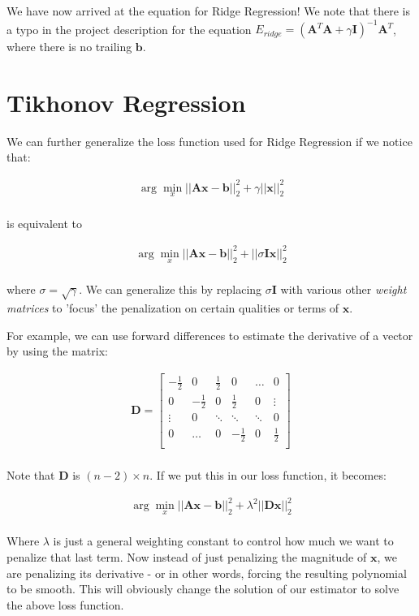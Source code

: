 \documentclass{article}
\newcommand{\x}{\mathbf{x}}
\newcommand{\A}{\mathbf{A}}
\newcommand{\B}{\mathbf{b}} %
\newcommand{\I}{\mathbf{I}}
\newcommand{\D}{\mathbf{D}}
\begin{document}
We have now arrived at the equation for Ridge Regression! We note that there is a typo in the project description for the equation $E_{ridge}=( \A ^T \A + \gamma \I )^{-1} \A ^T$, where there is no trailing $\B$.

\section{Tikhonov Regression}
We can further generalize the loss function used for Ridge Regression if we notice that:


\begin{align*}
\arg \min_{x} ||\A\x-\B||_{2}^{2} + \gamma||\x||_{2}^{2} \\
\end{align*}


is equivalent to 


\begin{align*}
\arg \min_{x} ||\A\x-\B||_{2}^{2} + ||\sigma \I \x||_{2}^{2} \\
\end{align*}

where $\sigma = \sqrt{\gamma}$. We can generalize this by replacing $\sigma \I $ with various other \emph{weight matrices} to 'focus' the penalization on certain qualities or terms of $\x$. 

For example, we can use forward differences to estimate the derivative of a vector by using the matrix:

\begin{align*}
  \D = \begin{bmatrix}
    -\frac{1}{2} & 0 & \frac{1}{2} & 0 & \dots & 0 \\
    0 & -\frac{1}{2} & 0 & \frac{1}{2} & 0 & \vdots \\
    \vdots & 0 & \ddots & \ddots & \ddots & 0 \\
    0 & \dots & 0 & -\frac{1}{2} & 0 & \frac{1}{2} \\ 
  \end{bmatrix}\\
\end{align*}

Note that $\D$ is $(n-2) \times n $. If we put this in our loss function, it becomes: 

\begin{align*}
\arg \min_{x} ||\A\x-\B||_{2}^{2} + \lambda^2||\D \x||_{2}^{2} \\
\end{align*}

Where $\lambda$ is just a general weighting constant to control how much we want to penalize that last term. Now instead of just penalizing the magnitude of $\x$, we are penalizing its derivative - or in other words, forcing the resulting polynomial to be smooth. This will obviously change the solution of our estimator to solve the above loss function. 
\end{document}
